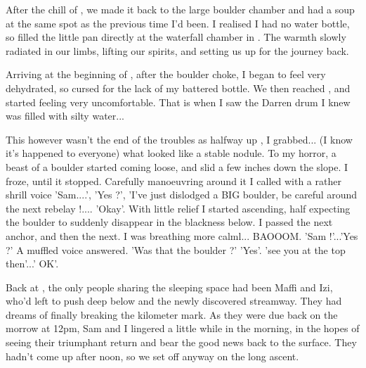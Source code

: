 After the chill of , we made it back to the large boulder chamber and had a soup at the same spot as the previous time I'd been. I realised I had no water bottle, so filled the little pan directly at the waterfall chamber in . The warmth slowly radiated in our limbs, lifting our spirits, and setting us up for the journey back.

Arriving at the beginning of , after the boulder choke, I began to feel very dehydrated, so cursed for the lack of my battered bottle. We then reached , and started feeling very uncomfortable. That is when I saw the Darren drum I knew was filled with silty water...

This however wasn't the end of the troubles as halfway up , I grabbed... (I know it's happened to everyone) what looked like a stable nodule. To my horror, a beast of a boulder started coming loose, and slid a few inches down the slope. I froze, until it stopped. Carefully manoeuvring around it I called with a rather shrill voice 'Sam....', 'Yes ?', 'I've just dislodged a BIG boulder, be careful around the next rebelay !.... 'Okay'. With little relief I started ascending, half expecting the boulder to suddenly disappear in the blackness below. I passed the next anchor, and then the next. I was breathing more calml... BAOOOM.
'Sam !'...'Yes ?' A muffled voice answered. 'Was that the boulder ?' 'Yes'. 'see you at the top then'...' OK'.

Back at , the only people sharing the sleeping space had been Maffi and Izi, who'd left to push deep below  and the newly discovered  streamway. They had dreams of finally breaking the kilometer mark. As they were due back on the morrow at 12pm, Sam and I lingered a little while in the morning, in the hopes of seeing their triumphant return and bear the good news back to the surface. They hadn't come up after noon, so we set off anyway on the long ascent. 

